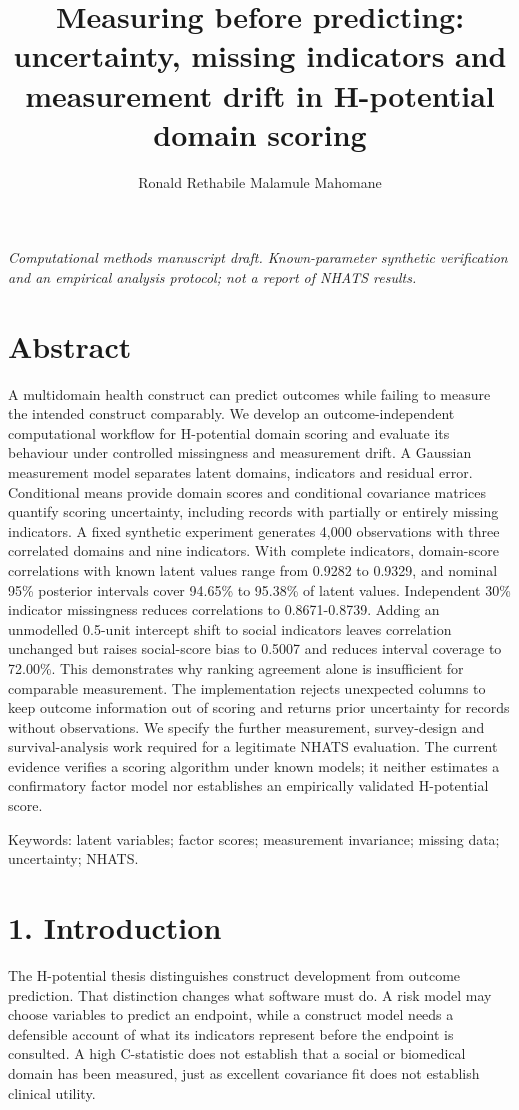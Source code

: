 \documentclass[11pt,a4paper]{article}
\title{Measuring before predicting: uncertainty, missing indicators and measurement drift in H-potential domain scoring}
\author{Ronald Rethabile Malamule Mahomane}
\date{}
\begin{document}
\maketitle
\begin{center}\small\itshape Computational methods manuscript draft. Known-parameter synthetic verification and an empirical analysis protocol; not a report of NHATS results.\end{center}

\section*{Abstract}
A multidomain health construct can predict outcomes while failing to measure the intended construct comparably. We develop an outcome-independent computational workflow for H-potential domain scoring and evaluate its behaviour under controlled missingness and measurement drift. A Gaussian measurement model separates latent domains, indicators and residual error. Conditional means provide domain scores and conditional covariance matrices quantify scoring uncertainty, including records with partially or entirely missing indicators. A fixed synthetic experiment generates 4,000 observations with three correlated domains and nine indicators. With complete indicators, domain-score correlations with known latent values range from 0.9282 to 0.9329, and nominal 95\% posterior intervals cover 94.65\% to 95.38\% of latent values. Independent 30\% indicator missingness reduces correlations to 0.8671-0.8739. Adding an unmodelled 0.5-unit intercept shift to social indicators leaves correlation unchanged but raises social-score bias to 0.5007 and reduces interval coverage to 72.00\%. This demonstrates why ranking agreement alone is insufficient for comparable measurement. The implementation rejects unexpected columns to keep outcome information out of scoring and returns prior uncertainty for records without observations. We specify the further measurement, survey-design and survival-analysis work required for a legitimate NHATS evaluation. The current evidence verifies a scoring algorithm under known models; it neither estimates a confirmatory factor model nor establishes an empirically validated H-potential score.

Keywords: latent variables; factor scores; measurement invariance; missing data; uncertainty; NHATS.

\section*{1. Introduction}
The H-potential thesis distinguishes construct development from outcome prediction. That distinction changes what software must do. A risk model may choose variables to predict an endpoint, while a construct model needs a defensible account of what its indicators represent before the endpoint is consulted. A high C-statistic does not establish that a social or biomedical domain has been measured, just as excellent covariance fit does not establish clinical utility.
\end{document}
